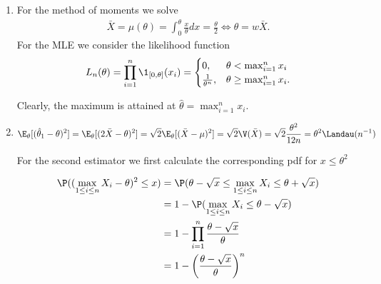 \begin{solution}

\phantom{}

\begin{enumerate}[label = (\alph*)]
  \item For the method of moments we solve
  \begin{align}
    \bar{X} = \mu(\theta) = \int_0^\theta \frac{x}{\theta} dx = \frac{\theta}{2}
    \iff \theta = w\bar{X}.
  \end{align}
  For the MLE we consider the likelihood function
  \begin{align*}
    L_n(\theta) = \prod_{i=1}^n \1_{[0, \theta]}(x_i)
    = \begin{cases}
      0, & \theta < \max_{i=1}^n x_i \\
      \frac{1}{\theta^n}, & \theta \geq \max_{i=1}^n x_i.
    \end{cases}
  \end{align*}

  Clearly, the maximum is attained at $\hat{\theta} = \max_{i=1}^n x_i.$

  \item

  \begin{align*}
    \E_\theta[(\hat{\theta}_1 - \theta)^2] = \E_\theta[(2\bar{X} - \theta)^2]
    = \sqrt{2}\E_\theta[(\bar{X} - \mu)^2] = \sqrt{2}\V(\bar{X}) = \sqrt{2}\frac{\theta^2}{12n}
    = \theta^2 \Landau(n^{-1})
  \end{align*}

  For the second estimator we first calculate the corresponding pdf for $x \leq \theta^2$

  \begin{align*}
    \P((\max_{1 \leq i \leq n} X_i - \theta)^2 \leq x) &=
    \P(\theta - \sqrt{x} \leq \max_{1 \leq i \leq n} X_i \leq \theta + \sqrt{x}) \\
    &= 1 - \P(\max_{1\leq i \leq n} X_i \leq \theta - \sqrt{x}) \\
    &= 1 - \prod_{i=1}^n \frac{\theta - \sqrt{x}}{\theta} \\
    &= 1 - \left(\frac{\theta - \sqrt{x}}{\theta}\right)^n
  \end{align*}


\end{enumerate}
\end{solution}
